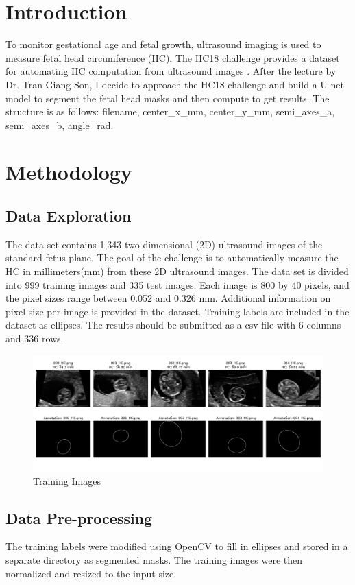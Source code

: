 \documentclass[twocolumn]{article}
\begin{document}
\section{Introduction}
To monitor gestational age and fetal growth, ultrasound imaging is used to measure fetal head circumference (HC). The HC18 challenge provides a dataset for automating HC computation from ultrasound images \cite{van2018automated}. After the lecture by Dr. Tran Giang Son, I decide to approach the HC18 challenge and build a U-net model to segment the fetal head masks and then compute to get results. The structure is as follows: \textnormal{filename, center\_x\_mm, center\_y\_mm, semi\_axes\_a, semi\_axes\_b, angle\_rad}.

\section{Methodology}
\subsection{Data Exploration}
The data set contains 1,343 two-dimensional (2D) ultrasound images of the standard fetus plane. The goal of the challenge is to automatically measure the HC in millimeters(mm) from these 2D ultrasound images. The data set is divided into 999 training images and 335 test images. Each image is 800 by 40 pixels, and the pixel sizes range between 0.052 and 0.326 mm. Additional information on pixel size per image is provided in the dataset. Training labels are included in the dataset as ellipses. The results should be submitted as a csv file with 6 columns and 336 rows.

\begin{figure}[H]
    \centering
    \includegraphics[width=1\linewidth]{figures/annotation_img.png}
    \caption{Training Images}
    \label{fig:enter-label}
\end{figure}

\subsection{Data Pre-processing}
The training labels were modified using OpenCV to fill in ellipses and stored in a separate directory as segmented masks. The training images were then normalized and resized to the input size.
\end{document}
